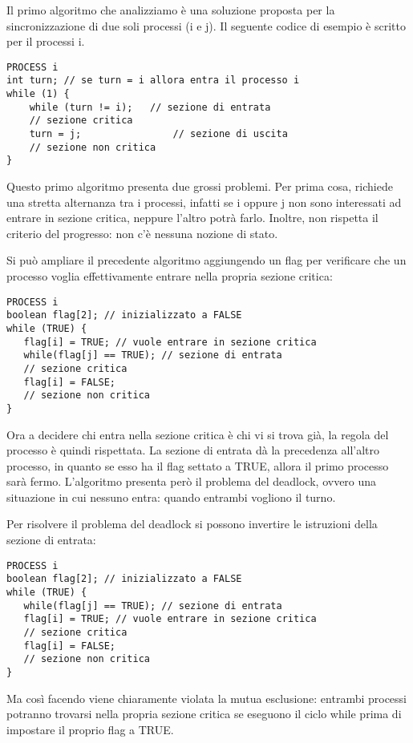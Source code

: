 \documentclass[a4paper]{article}
\begin{document}
Il primo algoritmo che analizziamo è una soluzione proposta per la sincronizzazione di due soli processi (i e j). Il seguente codice di esempio è scritto per il processi i.
\begin{verbatim}
PROCESS i
int turn; // se turn = i allora entra il processo i
while (1) {
    while (turn != i);   // sezione di entrata
    // sezione critica
    turn = j;                // sezione di uscita
    // sezione non critica
}
\end{verbatim}
Questo primo algoritmo presenta due grossi problemi. Per prima cosa, richiede una stretta alternanza tra i processi, infatti se i oppure j non sono interessati ad entrare in sezione critica, neppure l'altro potrà farlo. Inoltre, non rispetta il criterio del progresso: non c'è nessuna nozione di stato.

Si può ampliare il precedente algoritmo aggiungendo un flag per verificare che un processo voglia effettivamente entrare nella propria sezione critica:
\begin{verbatim}
PROCESS i
boolean flag[2]; // inizializzato a FALSE
while (TRUE) {
   flag[i] = TRUE; // vuole entrare in sezione critica
   while(flag[j] == TRUE); // sezione di entrata
   // sezione critica
   flag[i] = FALSE;
   // sezione non critica
}
\end{verbatim}
Ora a decidere chi entra nella sezione critica è chi vi si trova già, la regola del processo è quindi rispettata. La sezione di entrata dà la precedenza all'altro processo, in quanto se esso ha il flag settato a TRUE, allora il primo processo sarà fermo. L'algoritmo presenta però il problema del deadlock, ovvero una situazione in cui nessuno entra: quando entrambi vogliono il turno.

Per risolvere il problema del deadlock si possono invertire le istruzioni della sezione di entrata:
\begin{verbatim}
PROCESS i
boolean flag[2]; // inizializzato a FALSE
while (TRUE) {
   while(flag[j] == TRUE); // sezione di entrata
   flag[i] = TRUE; // vuole entrare in sezione critica
   // sezione critica
   flag[i] = FALSE;
   // sezione non critica
}
\end{verbatim}
Ma così facendo viene chiaramente violata la mutua esclusione: entrambi processi potranno trovarsi nella propria sezione critica se eseguono il ciclo while prima di impostare il proprio flag a TRUE.
\end{document}
